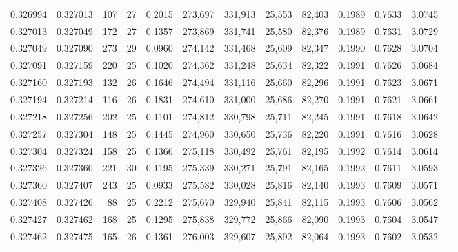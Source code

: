 \begin{tabular}{rrrrrrrrrrrrr}
0.326994 & 0.327013 &   107 &  27 &                                     0.2015 & 273,697 & 331,913 &  25,553 &  82,403 & 0.1989 & 0.7633 & 3.0745 \\
0.327013 & 0.327049 &   172 &  27 &                                     0.1357 & 273,869 & 331,741 &  25,580 &  82,376 & 0.1989 & 0.7631 & 3.0729 \\
0.327049 & 0.327090 &   273 &  29 &                                     0.0960 & 274,142 & 331,468 &  25,609 &  82,347 & 0.1990 & 0.7628 & 3.0704 \\
0.327091 & 0.327159 &   220 &  25 &                                     0.1020 & 274,362 & 331,248 &  25,634 &  82,322 & 0.1991 & 0.7626 & 3.0684 \\
0.327160 & 0.327193 &   132 &  26 &                                     0.1646 & 274,494 & 331,116 &  25,660 &  82,296 & 0.1991 & 0.7623 & 3.0671 \\
0.327194 & 0.327214 &   116 &  26 &                                     0.1831 & 274,610 & 331,000 &  25,686 &  82,270 & 0.1991 & 0.7621 & 3.0661 \\
0.327218 & 0.327256 &   202 &  25 &                                     0.1101 & 274,812 & 330,798 &  25,711 &  82,245 & 0.1991 & 0.7618 & 3.0642 \\
0.327257 & 0.327304 &   148 &  25 &                                     0.1445 & 274,960 & 330,650 &  25,736 &  82,220 & 0.1991 & 0.7616 & 3.0628 \\
0.327304 & 0.327324 &   158 &  25 &                                     0.1366 & 275,118 & 330,492 &  25,761 &  82,195 & 0.1992 & 0.7614 & 3.0614 \\
0.327326 & 0.327360 &   221 &  30 &                                     0.1195 & 275,339 & 330,271 &  25,791 &  82,165 & 0.1992 & 0.7611 & 3.0593 \\
0.327360 & 0.327407 &   243 &  25 &                                     0.0933 & 275,582 & 330,028 &  25,816 &  82,140 & 0.1993 & 0.7609 & 3.0571 \\
0.327408 & 0.327426 &    88 &  25 &                                     0.2212 & 275,670 & 329,940 &  25,841 &  82,115 & 0.1993 & 0.7606 & 3.0562 \\
0.327427 & 0.327462 &   168 &  25 &                                     0.1295 & 275,838 & 329,772 &  25,866 &  82,090 & 0.1993 & 0.7604 & 3.0547 \\
0.327462 & 0.327475 &   165 &  26 &                                     0.1361 & 276,003 & 329,607 &  25,892 &  82,064 & 0.1993 & 0.7602 & 3.0532 \\

\end{tabular}
